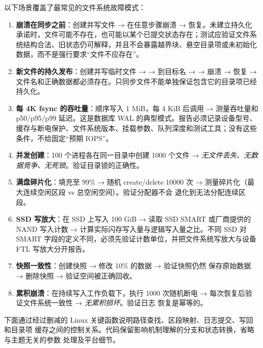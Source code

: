 \begin{filesystemlayout}

以下场景覆盖了最常见的文件系统故障模式：

\begin{enumerate}\tightlist
\item \textbf{崩溃在同步之前}：创建并写文件 → 在任意步骤崩溃 → 恢复。未建立持久化承诺时，文件可能不存在，也可能以某个已提交状态存在；测试应验证文件系统结构合法、旧状态仍可解释，并且不会暴露越界块、悬空目录项或未初始化数据，而不是强行要求“文件不应存在”。
\item \textbf{新文件的持久发布}：创建并写临时文件 →  →  到目标名 →  → 崩溃 → 恢复 → 文件名和正确数据都必须存在。只同步文件不能单独保证包含它的目录项已经持久化。
\item \textbf{每 4K fsync 的吞吐量}：顺序写入 1 MiB，每 4 KiB 后调用
       → 测量吞吐量和 p50/p95/p99 延迟。这是数据库 WAL 的典型模式。报告必须记录设备型号、缓存与断电保护、文件系统版本、挂载参数、队列深度和测试工具；没有这些条件，不给固定“预期 IOPS”。
\item \textbf{并发创建}：100 个进程各在同一目录中创建 1000 个文件 →
      \emph{无文件丢失、无数据竞争、无死锁}。验证目录锁的正确性。
\item \textbf{满盘碎片化}：填充至 99\% → 随机 create/delete 10000 次 →
      测量碎片化（最大连续空闲区段 vs 总空闲空间）。验证分配器不会
      退化到无法分配连续区段。
\item \textbf{SSD 写放大}：在 SSD 上写入 100 GiB → 读取 SSD SMART
       或厂商提供的 NAND 写入计数 → 计算实际闪存写入量与逻辑写入量之比。不同 SSD 对 SMART 字段的定义不同，必须先验证计数单位，并把文件系统写放大与设备 FTL 写放大分开报告。
\item \textbf{快照一致性}：创建快照 → 修改 10\% 的数据 → 验证快照仍然
      保存原始数据 → 删除快照 → 验证空间被正确回收。
\item \textbf{累积崩溃}：在持续写入工作负载下，执行 1000 次随机断电 →
      每次恢复后验证文件系统一致性 → \emph{无累积损坏}。验证日志
      恢复是幂等的。
\end{enumerate}


下面通过经过删减的 Linux 关键函数说明路径查找、区段映射、日志提交、写回和目录项
缓存之间的控制关系。代码保留影响机制理解的分支和状态转换，省略与主题无关的参数
处理及平台细节。


\end{filesystemlayout}

